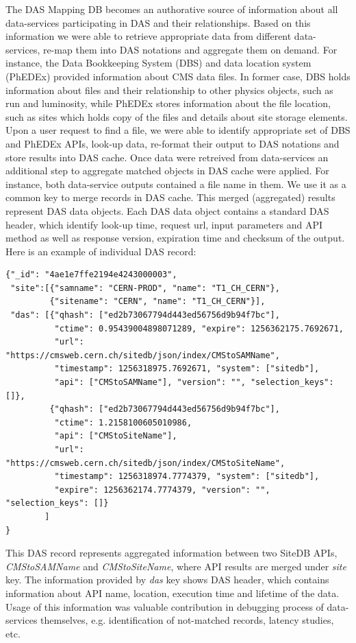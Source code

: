 \documentclass[a4paper]{jpconf}
\begin{document}
The DAS Mapping DB becomes an authorative
source of information about all data-services participating in DAS and their
relationships. Based on this information we were able to retrieve appropriate data
from different data-services, re-map them into DAS notations and
aggregate them on demand.
For instance, the Data Bookkeeping System (DBS) and data location system (PhEDEx)
provided information about CMS data files. In former case, DBS holds information about
files and their relationship to other physics objects, such as run and luminosity, 
while PhEDEx stores information about the file location, such as sites which
holds copy of the files and details about site storage elements.
Upon a user request to find a file, we were able to identify appropriate set of
DBS and PhEDEx APIs, look-up data, re-format their output to DAS notations and
store results into DAS cache.
Once data were retreived from data-services an additional step to aggregate
matched objects in DAS cache were applied. For instance, both data-service outputs 
contained a file name in them. We use it as a common key to merge records in DAS cache.
This merged (aggregated) results represent DAS data objects. Each DAS data
object contains a standard DAS header, which identify look-up time,
request url, input parameters and API method as well as response version, expiration
time and checksum of the output. Here is an example of individual DAS record:
\begin{verbatim}
{"_id": "4ae1e7ffe2194e4243000003", 
 "site":[{"samname": "CERN-PROD", "name": "T1_CH_CERN"}, 
         {"sitename": "CERN", "name": "T1_CH_CERN"}], 
 "das": [{"qhash": ["ed2b73067794d443ed56756d9b94f7bc"], 
          "ctime": 0.95439004898071289, "expire": 1256362175.7692671, 
          "url": "https://cmsweb.cern.ch/sitedb/json/index/CMStoSAMName", 
          "timestamp": 1256318975.7692671, "system": ["sitedb"], 
          "api": ["CMStoSAMName"], "version": "", "selection_keys": []}, 
         {"qhash": ["ed2b73067794d443ed56756d9b94f7bc"], 
          "ctime": 1.2158100605010986, 
          "api": ["CMStoSiteName"], 
          "url": "https://cmsweb.cern.ch/sitedb/json/index/CMStoSiteName", 
          "timestamp": 1256318974.7774379, "system": ["sitedb"], 
          "expire": 1256362174.7774379, "version": "", "selection_keys": []}
        ]
}
\end{verbatim}
This DAS record represents aggregated information between two SiteDB APIs, 
{\it CMStoSAMName} and {\it CMStoSiteName}, where API results are merged 
under {\it site} key. The information provided by {\it das} key shows 
DAS header, which contains information about API name, location, execution 
time and lifetime of the data.
Usage of this information was valuable contribution in debugging process of
data-services themselves, e.g. identification of not-matched records, 
latency studies, etc.
\end{document}
